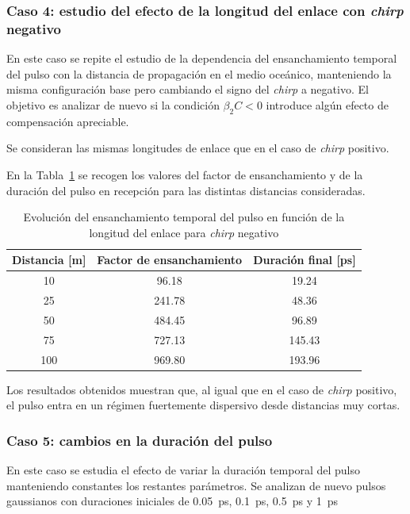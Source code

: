 \subsubsection*{Caso 4: estudio del efecto de la longitud del enlace con \textit{chirp} negativo}

En este caso se repite el estudio de la dependencia del ensanchamiento temporal del pulso con la distancia de propagación en el medio oceánico, manteniendo la misma configuración base pero cambiando el signo del \textit{chirp} a negativo. El objetivo es analizar de nuevo si la condición $\beta_2 C < 0$ introduce algún efecto de compensación apreciable.

Se consideran las mismas longitudes de enlace que en el caso de \textit{chirp} positivo.

En la Tabla~\ref{tabla_oceano_distancia_disp_chirp_neg} se recogen los valores del factor de ensanchamiento y de la duración del pulso en recepción para las distintas distancias consideradas.

\begin{table}[H]
\centering
\renewcommand{\arraystretch}{1.2}
\begin{tabular}{|c|c|c|}
\hline
\textbf{Distancia [m]} & \textbf{Factor de ensanchamiento} & \textbf{Duración final [ps]} \\
\hline
10  & 96.18  & 19.24 \\
25  & 241.78 & 48.36 \\
50  & 484.45 & 96.89 \\
75  & 727.13 & 145.43 \\
100 & 969.80 & 193.96 \\
\hline
\end{tabular}
\caption{Evolución del ensanchamiento temporal del pulso en función de la longitud del enlace para \textit{chirp} negativo}
\label{tabla_oceano_distancia_disp_chirp_neg}
\end{table}

Los resultados obtenidos muestran que, al igual que en el caso de \textit{chirp} positivo, el pulso entra en un régimen fuertemente dispersivo desde distancias muy cortas.

\subsubsection*{Caso 5: cambios en la duración del pulso}

En este caso se estudia el efecto de variar la duración temporal del pulso manteniendo constantes los restantes parámetros. Se analizan de nuevo pulsos gaussianos con duraciones iniciales de \SI{0.05}{\pico\second}, \SI{0.1}{\pico\second}, \SI{0.5}{\pico\second} y \SI{1}{\pico\second}


